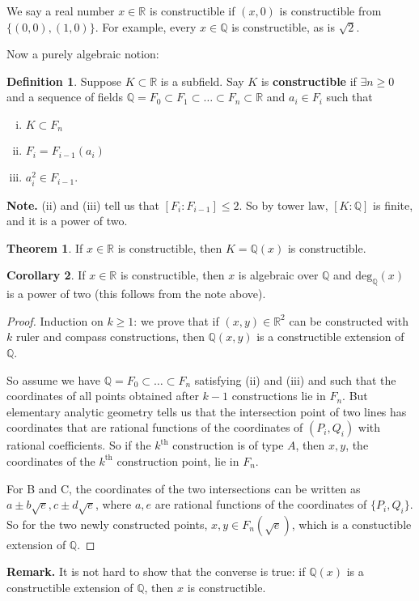\documentclass{article}
\theoremstyle{definition}
\newtheorem{theorem}{Theorem}[section]
\newtheorem{cor}[theorem]{Corollary}
\newtheorem{defn}{Definition}[section]
\begin{document}
We say a real number $x \in \mathbb{R}$ is constructible if $(x,0)$ is constructible from $\{(0,0),(1,0)\}$. For example, every $x \in \mathbb{Q}$ is constructible, as is $\sqrt{2}$.
\vspace{1mm}

Now a purely algebraic notion: 
\begin{defn}
    Suppose $K \subset \mathbb{R}$ is a subfield. Say $K$ is \textbf{constructible}  if $\exists n\ge 0$ and a sequence of fields $\mathbb{Q}=F_0 \subset F_1 \subset \ldots\subset F_n \subset \mathbb{R}$ and $a_i \in F_i$ such that 
    \begin{enumerate}[(i)]
        \item $K \subset F_n$
        \item $F_i = F_{i-1}(a_i)$
        \item $a_i^2 \in F_{i-1}$.
    \end{enumerate}
\end{defn}
\textbf{Note.} (ii) and (iii) tell us that $[F_i : F_{i-1}] \le 2$. So by tower law, $[K : \mathbb{Q}]$ is finite, and it is a power of two.

\begin{theorem}
    If $x \in \mathbb{R}$ is constructible, then $K = \mathbb{Q}(x)$ is constructible.
\end{theorem}
\begin{cor}
    If $x \in \mathbb{R}$ is constructible, then $x$ is algebraic over $\mathbb{Q}$ and $\text{deg}_{\mathbb{Q}}(x)$ is a power of two (this follows from the note above).
\end{cor}
\begin{proof}
    Induction on $k\ge 1$: we prove that if $(x,y) \in \mathbb{R}^2$ can be constructed with $k$ ruler and compass constructions, then $\mathbb{Q}(x,y)$ is a constructible extension of $\mathbb{Q}$.

    So assume we have $\mathbb{Q} = F_0 \subset  \ldots \subset  F_n$ satisfying (ii) and (iii) and such that the coordinates of all points obtained after $k-1$ constructions lie in $F_n$. But elementary analytic geometry tells us that the intersection point of two lines has coordinates that are rational functions of the coordinates of $(P_i,Q_i)$ with rational coefficients. So if the $k^{\text{th}}$ construction is of type $A$, then $x,y$, the coordinates of the $k^{\text{th}}$ construction point, lie in $F_n$.
    \vspace{1mm}
    
    For B and C, the coordinates of the two intersections can be written as $a \pm b\sqrt{e}, c \pm d\sqrt{e}$, where $a,e$ are rational functions of the coordinates of $\{P_i,Q_i\}$. So for the two newly constructed points, $x,y \in F_n(\sqrt{e})$, which is a constuctible extension of $\mathbb{Q}$.
\end{proof}
\textbf{Remark.} It is not hard to show that the converse is true: if $\mathbb{Q}(x)$ is a constructible extension of $\mathbb{Q}$, then $x$ is constructible.
\vspace{1mm}
\end{document}
